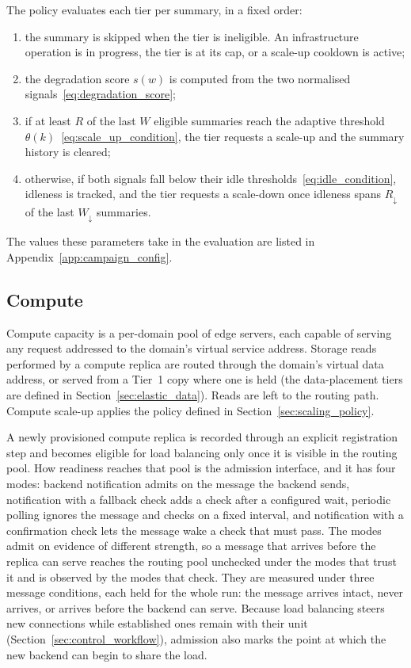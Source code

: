 ﻿\documentclass[12pt,reqno,twoside]{amsbook}
\begin{document}
The policy evaluates each tier per summary, in a fixed order:
\begin{enumerate}[leftmargin=*, itemsep=0pt]
    \item the summary is skipped when the tier is ineligible. An
    infrastructure operation is in progress, the tier is at its cap, or a
    scale-up cooldown is active;
    \item the degradation score $s(w)$ is computed from the two normalised
    signals~\eqref{eq:degradation_score};
    \item if at least $R$ of the last $W$ eligible summaries reach the adaptive
    threshold $\theta(k)$~\eqref{eq:scale_up_condition}, the tier requests
    a scale-up and the summary history is cleared;
    \item otherwise, if both signals fall below their idle
    thresholds~\eqref{eq:idle_condition}, idleness is tracked, and the
    tier requests a scale-down once idleness spans $R_\downarrow$ of the
    last $W_\downarrow$ summaries.
\end{enumerate}
    The values these parameters take in the evaluation are listed in
Appendix~\ref{app:campaign_config}.

\subsection{Compute}\label{sec:elastic_compute}
Compute capacity is a per-domain pool of edge servers, each
capable of serving any request addressed to the domain's virtual service
address. Storage reads performed by a compute replica are routed through the
domain's virtual data address, or served from a Tier~1 copy where one is
held (the data-placement tiers are defined in Section~\ref{sec:elastic_data}).
Reads are left to the routing path. Compute scale-up
applies the policy defined in Section~\ref{sec:scaling_policy}.

A newly provisioned compute replica is recorded through an explicit
registration step and becomes eligible for load balancing only once it is
visible in the routing pool. How readiness reaches that pool is the
admission interface, and it has four modes: backend notification admits on
the message the backend sends, notification with a fallback check adds a
check after a configured wait, periodic polling ignores the message and
checks on a fixed interval, and notification with a confirmation check lets
the message wake a check that must pass. The modes admit on evidence of
different strength, so a message that arrives before the replica can serve
reaches the routing pool unchecked under the modes that trust it and is
observed by the modes that check. They are measured under three message
conditions, each held for the whole run: the message arrives intact, never
arrives, or arrives before the backend can serve. Because load balancing
steers new connections while established ones remain with their unit
(Section~\ref{sec:control_workflow}), admission also marks the point at which
the new backend can begin to share the load.
\end{document}
